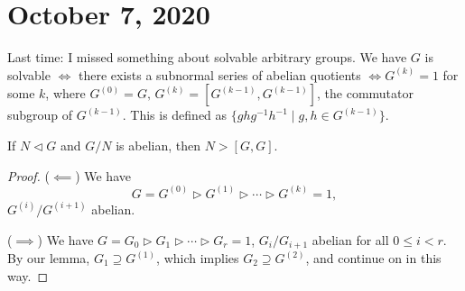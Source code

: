 \section{October 7, 2020}
Last time: I missed something about solvable arbitrary groups. We have $G$ is solvable $\iff$ there exists a subnormal series of abelian quotients $\iff G^{(k)}=1$ for some $k$, where $G^{(0)}=G,\,G^{(k)}=[G^{(k-1)},G^{(k-1)}]$, the commutator subgroup of $G^{(k-1)}$. This is defined as $\{ghg^{-1}h^{-1} \mid g,h\in G^{(k-1)}\} $. 
\begin{lemma}
    If $N \triangleleft G$ and $G /N$ is abelian, then $N>[G,G]$.
\end{lemma}
\begin{proof}
    ($\impliedby $) We have \[
        G=G^{(0)}\triangleright G^{(1)}\triangleright \cdots\triangleright G^{(k)}=1,
    \] $G^{(i)} / G^{(i+1)}$ abelian.

    ($\implies $) We have $G=G_0\triangleright G_1\triangleright\cdots\triangleright G_r=1$, $G_i /G_{i+1}$ abelian for all $0\leq i < r$. By our lemma, $G_1 \supseteq G^{(1)}$, which implies $G_2 \supseteq G^{(2)}$, and continue on in this way.
\end{proof}
